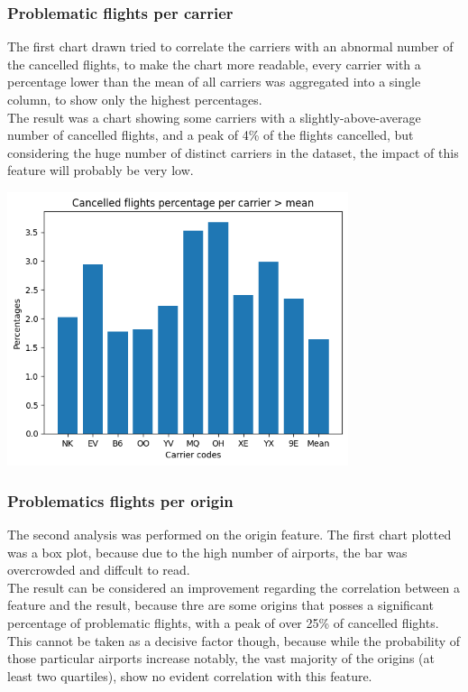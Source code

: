 \documentclass[
	letterpaper, %
	10pt, %
]{class}
\begin{document}
\subsubsection{Problematic flights per carrier}
The first chart drawn tried to correlate the carriers with an abnormal number of the cancelled flights, to make the chart more readable, every carrier with a percentage lower than the mean of all carriers was aggregated into a single column, to show only the highest percentages.\\

The result was a chart showing some carriers with a slightly-above-average number of cancelled flights, and a peak of 4\% of the flights  cancelled, but considering the huge number of distinct carriers in the dataset, the impact of this feature will probably be very low.

\begin{center}
    \includegraphics[width=10cm]{../images/cancelled_per_carrier.png}
\end{center}

\subsubsection{Problematics flights per origin}
The second analysis was performed on the origin feature.
The first chart plotted was a box plot, because due to the high number of airports, the bar was overcrowded and diffcult to read.\\

The result can be considered an improvement regarding the correlation between a feature and the result, because thre are some origins that posses a significant percentage
of problematic flights, with a peak of over 25\% of cancelled flights. This cannot be taken as a decisive factor though, because while the probability of those particular airports increase notably, the vast majority of the origins (at least two quartiles), show no evident correlation with this feature.
\end{document}
